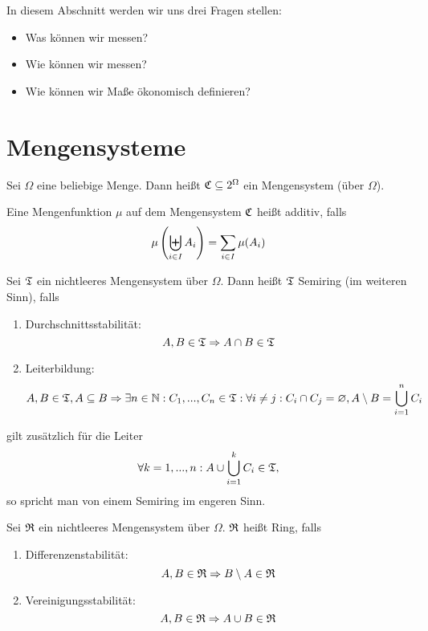 In diesem Abschnitt werden wir uns drei Fragen stellen:
	\begin{itemize}
		\item Was können wir messen?
		\item Wie können wir messen?
		\item Wie können wir Maße ökonomisch definieren?
	\end{itemize}
	
	\section{Mengensysteme}
		\begin{defi}
			Sei $\Omega$ eine beliebige Menge. Dann heißt $\mathfrak{C}\subseteq 2^\Omega$ ein Mengensystem (über $\Omega$).
		\end{defi}
		
		\begin{defi}
			Eine Mengenfunktion $\mu$ auf dem Mengensystem $\mathfrak{C}$ heißt additiv, falls
			\[ \mu \left ( \biguplus_{i \in I} A_i \right ) = \sum_{i \in I} \mu (A_i)\]
		\end{defi}
		
		\begin{defi} [Semiring]
			Sei $\mathfrak{T}$ ein nichtleeres Mengensystem über $\Omega$. Dann heißt $\mathfrak{T}$ Semiring (im weiteren Sinn), falls
			\begin{enumerate}
				\item Durchschnittsstabilität:
				\[ A,B\in\mathfrak{T}\Rightarrow A\cap B\in\mathfrak{T} \]
				\item Leiterbildung:
				\[ A,B\in\mathfrak{T}, A\subseteq B\Rightarrow \exists n\in\mathbb{N}: C_1,...,C_n\in\mathfrak{T}: \forall i\neq j: C_i\cap C_j=\varnothing, A\setminus B=\bigcup_{i=1}^n C_i \]
			\end{enumerate}
			gilt zusätzlich für die Leiter
			\[ \forall k=1,...,n: A\cup\bigcup_{i=1}^k C_i\in\mathfrak{T}, \]
			so spricht man von einem Semiring im engeren Sinn.
		\end{defi}
		
		\begin{defi}[Ring]
			Sei $\mathfrak{R}$ ein nichtleeres Mengensystem über $\Omega$. $\mathfrak{R}$ heißt Ring, falls
			\begin{enumerate}
				\item Differenzenstabilität:
				\[ A,B\in\mathfrak{R}\Rightarrow B\setminus A\in\mathfrak{R} \]
				\item Vereinigungsstabilität:
				\[ A,B\in\mathfrak{R}\Rightarrow A\cup B\in\mathfrak{R} \]
			\end{enumerate}
		\end{defi}
		

